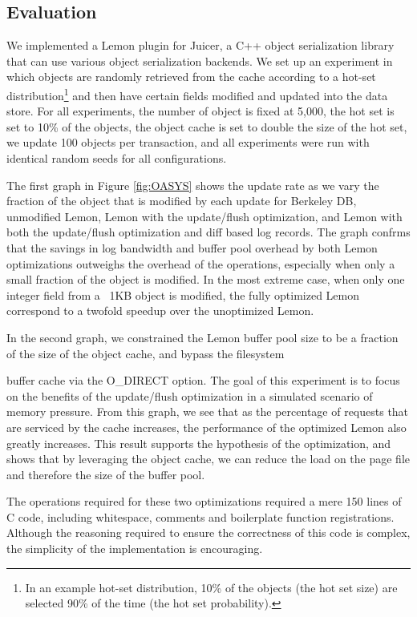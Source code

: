 \documentclass[letterpaper,twocolumn,english]{article}
\newcommand{\yad}{Lemon\xspace}
\newcommand{\oasys}{Juicer\xspace}
\begin{document}
\subsection{Evaluation}

We implemented a \yad plugin for \oasys, a C++ object serialization
library that can use various object serialization backends. 
We set up an experiment in which objects are randomly
retrieved from the cache according to a hot-set distribution\footnote{In
an example hot-set distribution, 10\% of the objects (the hot set size) are
selected 90\% of the time (the hot set probability).} 
and then have certain fields modified and
updated into the data store. For all experiments, the number of object
is fixed at 5,000, the
hot set is set to 10\% of the objects, the object cache is set to
double the size of the hot set, we update 100 objects per
transaction, and all experiments were run with identical random seeds 
for all configurations.

The first graph in Figure \ref{fig:OASYS} shows the update rate as we
vary the fraction of the object that is modified by each update for
Berkeley DB, unmodified \yad, \yad with the update/flush optimization,
and \yad with both the update/flush optimization and diff based log
records.
The graph confrms that the savings in log bandwidth and
buffer pool overhead by both \yad optimizations 
outweighs the overhead of the operations, especially when only a small
fraction of the object is modified.
In the most extreme case, when
only one integer field from a ~1KB object is modified, the fully
optimized \yad correspond to a twofold speedup over the unoptimized
\yad.

In the second graph, we constrained the \yad buffer pool size to be a
fraction of the size of the object cache, and bypass the filesystem

buffer cache via the O\_DIRECT option. The goal of this experiment is to
focus on the benefits of the update/flush optimization in a simulated
scenario of memory pressure. From this graph, we see that as the percentage of
requests that are serviced by the cache increases, the
performance of the optimized \yad also greatly increases.
This result supports the hypothesis of the optimization, and
shows that by leveraging the object cache, we can reduce the load on
the page file and therefore the size of the buffer pool.

The operations required for these
two optimizations required a mere 150 lines of C code, including
whitespace, comments and boilerplate function registrations.  Although
the reasoning required to ensure the correctness of this code is
complex, the simplicity of the implementation is encouraging.
\end{document}

